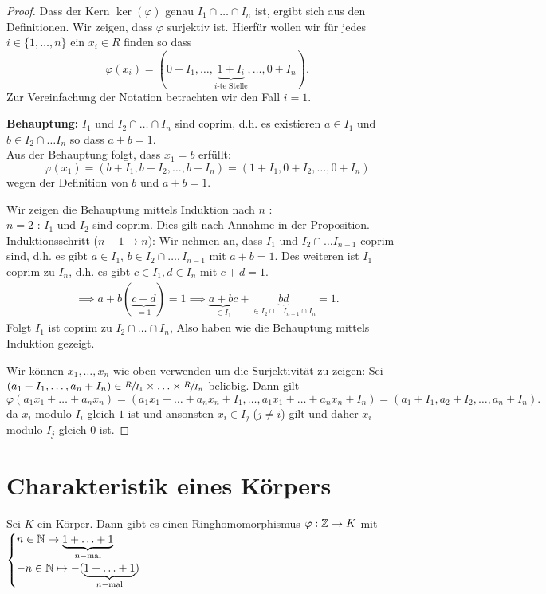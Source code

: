 \begin{proof}
	Dass der Kern $\ker(\varphi)$ genau $I_1 \cap \ldots \cap I_{n}$ ist, ergibt sich aus den Definitionen.
	Wir zeigen, dass $ \varphi$ surjektiv ist.
	Hierfür wollen wir für jedes $i \in \{1,\ldots,n\} $ ein $x_{i} \in R$ finden so dass
	\[
		\varphi(x_{i}) = (0+I_{1},\ldots,\underbrace{1+I_{i}}_{i\text{-te Stelle}},\ldots, 0+I_{n})
	.\] 
	Zur Vereinfachung der Notation betrachten wir den Fall $i = 1$.

	\textbf{Behauptung:} $I_1$ und $I_2 \cap \ldots \cap I_{n}$ sind coprim, d.h. es existieren $a \in I_1$ und $b \in I_2 \cap \ldots I_{n}$ so dass $a+b = 1$.\\
	Aus der Behauptung folgt, dass $x_1 = b$ erfüllt:
	\[
		\varphi(x_1) = (b + I_1, b+I_2,\ldots,b+I_{n}) = (1+ I_1, 0 + I_2, \ldots, 0+I_{n})
	\] 
	wegen der Definition von $b$ und $a + b = 1$.

	Wir zeigen die Behauptung mittels Induktion nach $n$ :\\
	$n=2$ : $I_1$ und $I_2$ sind coprim. Dies gilt nach Annahme in der Proposition.\\
	Induktionsschritt ($n-1 \to n$): Wir nehmen an, dass $I_1$ und $I_2 \cap \ldots I_{n-1}$ coprim sind, d.h. es gibt
	$a \in I_1$, $b \in I_2 \cap \ldots, I_{n-1}$ mit $a+b = 1$.
	Des weiteren ist $I_1$ coprim zu $I_{n}$, d.h. es gibt $c \in I_1, d \in I_{n}$ mit $c+d=1$.
	\begin{align*}
		\implies a+b (\underbrace{c+d}_{=1}) = 1 \implies \underbrace{a+bc}_{\in I_1} + \underbrace{bd}_{\in I_2 \cap \ldots I_{n-1} \cap I_{n}} = 1
	.\end{align*}
	Folgt $I_1$ ist coprim zu $I_2 \cap \ldots \cap I_{n}$,
	Also haben wie die Behauptung mittels Induktion gezeigt.

	Wir können $x_1,\ldots,x_{n}$ wie oben verwenden um die Surjektivität zu zeigen:
	Sei $(a_1 + I_1,\ldots,a_{n} + I_{n}) \in \sfrac{R}{I_1} \times \ldots \times \sfrac{R}{I_{n}}$ beliebig.
	Dann gilt
	\[
		\varphi(a_1 x_1 + \ldots + a_{n} x_{n}) = (a_1 x_1 + \ldots + a_{n} x_{n} + I_1, \ldots, a_1 x_1 + \ldots + a_{n} x_{n} + I_{n})
		= (a_1 + I_1, a_2 + I_2,\ldots,a_{n} + I_{n})
	.\] 
	da $x_i$ modulo $I_i$ gleich $1$ ist und ansonsten $x_{i} \in I_{j}$ ($j \neq i$) gilt und daher $x_{i}$ modulo $I_{j}$ gleich $0$ ist.
\end{proof}

\section{Charakteristik eines Körpers}
Sei $K$ ein Körper. Dann gibt es einen Ringhomomorphismus $ \varphi: \mathbb{Z} \to K$ mit $\begin{cases}
	n \in \mathbb{N} \mapsto \underbrace{1+\ldots+1}_{n-\text{mal}}\\
	-n \in \mathbb{N} \mapsto -(\underbrace{1+\ldots+1}_{n-\text{mal}})
\end{cases}$

